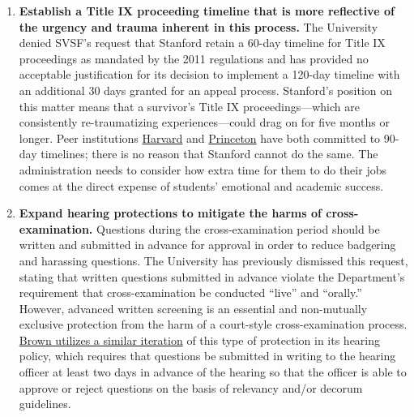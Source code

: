 \documentclass[12pt, titlepage, letterpaper]{article}
\begin{document}
\begin{enumerate}[label=\textbf{\arabic*.}]
    \item \textbf{Establish a Title IX proceeding timeline that is more reflective of the urgency and trauma inherent in this process.} The University denied SVSF’s request that Stanford retain a 60-day timeline for Title IX proceedings as mandated by the 2011 regulations and has provided no acceptable justification for its decision to implement a 120-day timeline with an additional 30 days granted for an appeal process. Stanford’s position on this matter means that a survivor’s Title IX proceedings---which are consistently re-traumatizing experiences---could drag on for five months or longer. Peer institutions \href{https://titleix.harvard.edu/files/titleix/files/harvard_university_interim_title_ix_sexual_harassment_student_procedures.pdf}{Harvard} and \href{https://sexualmisconduct.princeton.edu/policy}{Princeton} have both committed to 90-day timelines; there is no reason that Stanford cannot do the same. The administration needs to consider how extra time for them to do their jobs comes at the direct expense of students’ emotional and academic success. 

    \item \textbf{Expand hearing protections to mitigate the harms of cross-examination.} Questions during the cross-examination period should be written and submitted in advance for approval in order to reduce badgering and harassing questions. The University has previously dismissed this request, stating that written questions submitted in advance violate the Department’s requirement that cross-examination be conducted “live” and “orally.” However, advanced written screening is an essential and non-mutually exclusive protection from the harm of a court-style cross-examination process. \href{https://www.brown.edu/about/administration/title-ix/Title\%20IX\%20grievance\%20Procedure}{Brown utilizes a similar iteration} of this type of protection in its hearing policy, which requires that questions be submitted in writing to the hearing officer at least two days in advance of the hearing so that the officer is able to approve or reject questions on the basis of relevancy and/or decorum guidelines. 


\end{enumerate}
\end{document}
